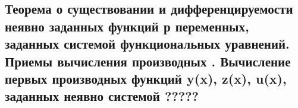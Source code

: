{
\subsection{Теорема о существовании и дифференцируемости неявно заданных функций  р  переменных, заданных системой функциональных уравнений. Приемы вычисления производных .  
Вычисление первых производных функций y(x), z(x), u(x), заданных неявно системой
 ?????}
}